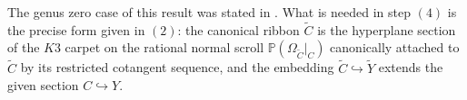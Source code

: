 \documentclass[11pt,twoside]{amsart}
\theoremstyle{plain}
\newtheorem{theorem}{Theorem}[section]
\theoremstyle{definition}
\newcommand{\PP}{\mathbb{P}}
\newcommand{\OO}{\mathcal{O}}
\newcommand{\Ext}{\operatorname{Ext}}
\newcommand{\Yt}{\widetilde{Y}}
\newcommand{\Ct}{\widetilde{C}}
\newcommand{\SC}{\mathcal{S}_C}
\newcommand{\RC}{\mathcal{R}_C}
\newcommand{\GH}{G_H}
\begin{document}
The genus zero case of this result was stated in \cite{BE95}. What is needed in step $(4)$ is the precise form given in  $(2)$: the canonical ribbon $\Ct$ is the hyperplane section of the $K3$ carpet on the rational normal scroll $\PP(\Omega_{\Ct}|_C)$ canonically attached to $\Ct$ by its restricted cotangent sequence, and the embedding $\Ct \hookrightarrow \Yt$ extends the given section $C \hookrightarrow Y$.



\end{document}
